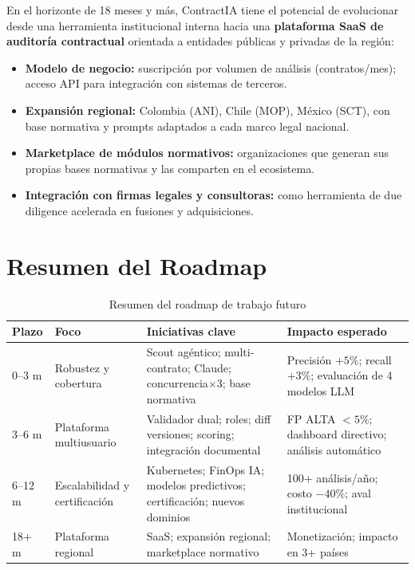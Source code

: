 En el horizonte de 18 meses y más, ContractIA tiene el potencial de
evolucionar desde una herramienta institucional interna hacia una
\textbf{plataforma SaaS de auditoría contractual} orientada a entidades
públicas y privadas de la región:

\begin{itemize}
    \item \textbf{Modelo de negocio:} suscripción por volumen de análisis
    (contratos/mes); acceso API para integración con sistemas de terceros.
    \item \textbf{Expansión regional:} Colombia (ANI), Chile (MOP), México
    (SCT), con base normativa y prompts adaptados a cada marco legal nacional.
    \item \textbf{Marketplace de módulos normativos:} organizaciones que
    generan sus propias bases normativas y las comparten en el ecosistema.
    \item \textbf{Integración con firmas legales y consultoras:} como
    herramienta de due diligence acelerada en fusiones y adquisiciones.
\end{itemize}

\section*{Resumen del Roadmap}

\begin{table}[H]
\centering
\caption{Resumen del roadmap de trabajo futuro}
\label{tab:roadmap}
\begin{tabular}{p{1.5cm} p{3cm} p{4cm} p{4.5cm}}
\toprule
\textbf{Plazo} & \textbf{Foco} & \textbf{Iniciativas clave} & \textbf{Impacto esperado} \\
\midrule
0--3 m &
    Robustez y cobertura &
    Scout agéntico; multi-contrato; Claude; concurrencia$\times$3; base normativa &
    Precisión $+5\%$; recall $+3\%$; evaluación de 4 modelos LLM \\
3--6 m &
    Plataforma multiusuario &
    Validador dual; roles; diff versiones; scoring; integración documental &
    FP ALTA $< 5\%$; dashboard directivo; análisis automático \\
6--12 m &
    Escalabilidad y certificación &
    Kubernetes; FinOps IA; modelos predictivos; certificación; nuevos dominios &
    100+ análisis/año; costo $-40\%$; aval institucional \\
18+ m &
    Plataforma regional &
    SaaS; expansión regional; marketplace normativo &
    Monetización; impacto en 3+ países \\
\bottomrule
\end{tabular}
\end{table}